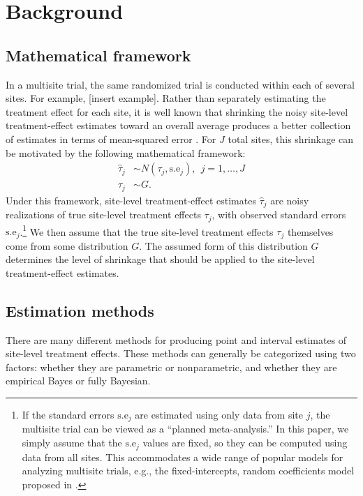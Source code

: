 \documentclass[]{article}
\begin{document}
\section{Background}

\subsection{Mathematical framework}

In a multisite trial, the same randomized trial is conducted within each of several sites.
For example, [insert example].
Rather than separately estimating the treatment effect for each site, it is well known that shrinking the noisy site-level treatment-effect estimates toward an overall average produces a better collection of estimates in terms of mean-squared error \citep{james1961estimation}.
For $J$ total sites, this shrinkage can be motivated by the following mathematical framework:
\begin{align*}
    \hat{\tau}_j &\sim N(\tau_j, \text{s.e}_j), \ \ j=1,\dots,J \\
    \tau_j &\sim G.
\end{align*}
Under this framework, site-level treatment-effect estimates $\hat{\tau}_j$ are noisy realizations of true site-level treatment effects $\tau_j$, with observed standard errors $\text{s.e}_j$.\footnote{If the standard errors $\text{s.e}_j$ are estimated using only data from site $j$, the multisite trial can be viewed as a ``planned meta-analysis.''
In this paper, we simply assume that the $\text{s.e}_j$ values are fixed, so they can be computed using data from all sites.
This accommodates a wide range of popular models for analyzing multisite trials, e.g., the fixed-intercepts, random coefficients model proposed in \cite{bloom2017using}.}
We then assume that the true site-level treatment effects $\tau_j$ themselves come from some distribution $G$.
The assumed form of this distribution $G$ determines the level of shrinkage that should be applied to the site-level treatment-effect estimates.

\subsection{Estimation methods}

There are many different methods for producing point and interval estimates of site-level treatment effects.
These methods can generally be categorized using two factors: whether they are parametric or nonparametric, and whether they are empirical Bayes or fully Bayesian.
\end{document}
